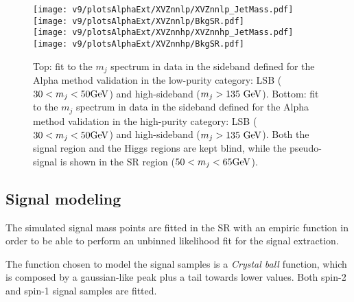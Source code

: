 \begin{figure}[!htb]
  \centering
    \texttt{[image: v9/plotsAlphaExt/XVZnnlp/XVZnnlp\_JetMass.pdf]}
    \texttt{[image: v9/plotsAlphaExt/XVZnnlp/BkgSR.pdf]}%
    \\
    \texttt{[image: v9/plotsAlphaExt/XVZnnhp/XVZnnhp\_JetMass.pdf]}
    \texttt{[image: v9/plotsAlphaExt/XVZnnhp/BkgSR.pdf]}%
  \caption{Top: fit to the $m_j$ spectrum in data in the sideband defined for the Alpha method validation in the low-purity category: LSB ($30 < m_j < 50\text{GeV}$) and high-sideband ($m_j > 135~\text{GeV}$). Bottom: fit to the $m_j$ spectrum in data in the sideband defined for the Alpha method validation in the high-purity category: LSB ($30 < m_j < 50\text{GeV}$) and high-sideband ($m_j > 135~\text{GeV}$). Both the signal region and the Higgs regions are kept blind, while the pseudo-signal is shown in the SR region ($50 < m_j < 65\text{GeV}$).}
  \label{fig:alphaClosure}
\end{figure}


\clearpage

\subsection{Signal modeling}

The simulated signal mass points are fitted in the SR with an empiric function in order to be able to perform an unbinned likelihood fit for the signal extraction. 



The function chosen to model the signal samples is a \emph{Crystal ball} function, which is composed by a gaussian-like peak plus a tail towards lower values. Both spin-2 and spin-1 signal samples are fitted.



